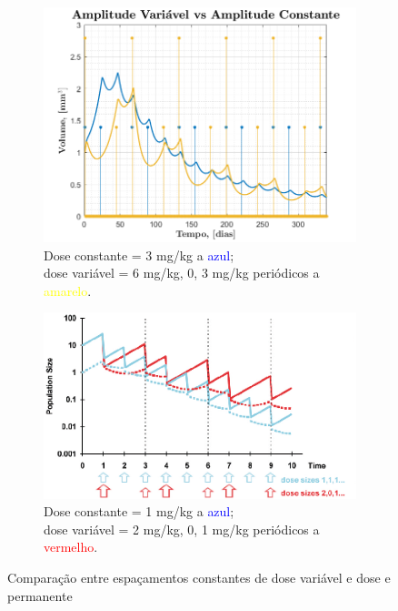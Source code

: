 \begin{figure}[ht] 
    \begin{subfigure}[b]{0.5\linewidth}
        \centering
        \includegraphics[width=0.8\linewidth]{img/perguntas/P5/P5-AmpVriation.png}
        \caption{Dose constante = 3 mg/kg a \textcolor{blue}{azul};\\ dose variável = 6 mg/kg, 0, 3 mg/kg periódicos a \textcolor{yellow}{amarelo}.} 
        \label{fig:AmpVarMatlab} 
    \end{subfigure}%
    \begin{subfigure}[b]{0.5\linewidth}
        \centering
        \includegraphics[width=0.8\linewidth]{img/perguntas/P5/P5-AmpVarDoc.png} 
        \caption{Dose constante = 1 mg/kg a \textcolor{blue}{azul};\\ dose variável = 2 mg/kg, 0, 1 mg/kg periódicos a \textcolor{red}{vermelho}.} 
        \label{fig:AmpVarDoc} 
    \end{subfigure}
    \vspace{-1.0em}\begin{minipage}{1\linewidth}
        \caption{Comparação entre espaçamentos constantes de dose variável e dose e permanente}
    \end{minipage}
\end{figure}

